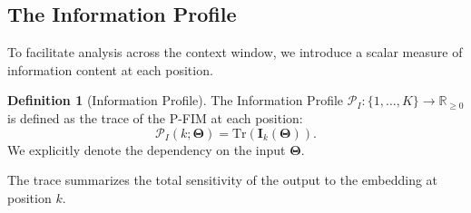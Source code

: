 \documentclass{article}
\theoremstyle{definition}
\newtheorem{definition}[theorem]{Definition}
\begin{document}
\subsection{The Information Profile}

To facilitate analysis across the context window, we introduce a scalar measure of information content at each position.

\begin{definition}[Information Profile]
The Information Profile $\mathcal{P}_I: \{1, \dots, K\} \to \mathbb{R}_{\geq 0}$ is defined as the trace of the P-FIM at each position:
\begin{equation}
    \mathcal{P}_I(k; \mathbf{\Theta}) = \text{Tr}(\mathbf{I}_k(\mathbf{\Theta})).
\end{equation}
We explicitly denote the dependency on the input $\mathbf{\Theta}$.
\end{definition}
The trace summarizes the total sensitivity of the output to the embedding at position $k$.
\end{document}
